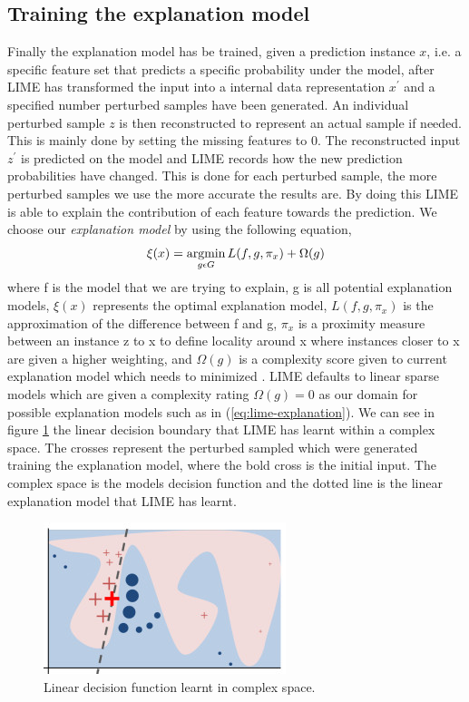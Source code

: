 \subsection{Training the explanation model} Finally the explanation model has be trained, given a prediction instance $x$, i.e. a specific feature set that predicts a specific probability under the model, after LIME has transformed the input into a internal data representation $x^{'}$ and a specified number perturbed samples have been generated. An individual perturbed sample $z$ is then reconstructed to represent an actual sample if needed. This is mainly done by setting the missing features to 0. The reconstructed input $z^{'}$ is predicted on the model and LIME records how the new prediction probabilities have changed. This is done for each perturbed sample, the more perturbed samples we use the more accurate the results are. By doing this LIME is able to explain the contribution of each feature towards the prediction.
We choose our \emph{explanation model} by using the following equation,
\begin{equation}
\xi(x) = \operatorname*{argmin}_{g\epsilon G} L (f, g,\pi_{x} ) + \Omega(g)
\label{eq:explanation-loss}
\end{equation}
where f is the model that we are trying to explain, g is all potential explanation models, $\xi(x)$ represents the optimal explanation model, $L(f, g, \pi_{x})$ is the approximation of the difference between f and g, $\pi_{x}$ is a proximity measure between an instance z to x to define locality around x where instances closer to x are given a higher weighting, and $\Omega(g)$ is a complexity score given to current explanation model which needs to minimized . LIME defaults to linear sparse models which are given a complexity rating $\Omega(g) = 0$  as our domain for possible explanation models such as in (\ref{eq:lime-explanation}).
We can see in figure \ref{fig:lime-boundary} the linear decision boundary that LIME has learnt within a complex space. The crosses represent the perturbed sampled which were generated training the explanation model, where the bold cross is the initial input. The complex space is the models decision function and the dotted line is the linear explanation model that LIME has learnt.

\begin  {figure}[!htpb]
\centering
  \includegraphics[width=0.7\linewidth]{Evaluation_Images/Lime_boundary.jpg}
  \caption{Linear decision function learnt in complex space.}
  \label{fig:lime-boundary}
\end{figure}



